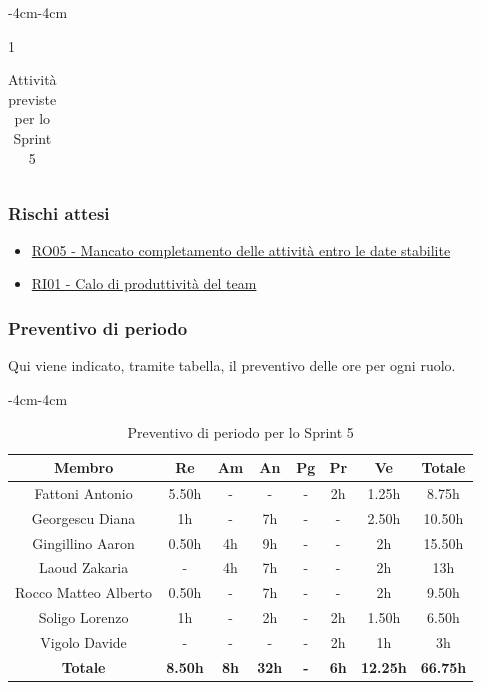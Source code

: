 \documentclass[a4paper,12pt]{article}
\begin{document}
\begin{table}[H]
\begin{adjustwidth}{-4cm}{-4cm}
\begin{spacing}{1}
\begin{tabular}{|p{4cm}|c|c|c|c|c|}
    \end{tabular}
    \end{spacing}
    \caption{Attività previste per lo Sprint 5}
    \end{adjustwidth}
\end{table}

\subsubsection{Rischi attesi}
\begin{itemize}
    \item \hyperref[RO05]{RO05 - Mancato completamento delle attività entro le date stabilite}
    \item \hyperref[RI01]{RI01 - Calo di produttività del team}
\end{itemize}

\subsubsection{Preventivo di periodo}
Qui viene indicato, tramite tabella, il preventivo delle ore per ogni ruolo.
\begin{table}[H]
    \begin{adjustwidth}{-4cm}{-4cm}
    \centering
    \begin{tabular}{|c|c|c|c|c|c|c|c|}
        \hline
        \textbf{Membro}& \textbf{Re} & \textbf{Am} & \textbf{An} & \textbf{Pg} & \textbf{Pr} & \textbf{Ve} & \textbf{Totale} \\
        \hline
        Fattoni Antonio & 5.50h & - & - & - & 2h & 1.25h & 8.75h \\
        \hline
        Georgescu Diana& 1h & - & 7h & - & - & 2.50h & 10.50h \\
        \hline
        Gingillino Aaron& 0.50h & 4h & 9h & - & - & 2h & 15.50h \\
        \hline
        Laoud Zakaria& - & 4h & 7h & - & - & 2h & 13h\\
        \hline
        Rocco Matteo Alberto & 0.50h & - & 7h & - & - & 2h & 9.50h \\
        \hline
        Soligo Lorenzo& 1h & - & 2h & - & 2h & 1.50h & 6.50h \\
        \hline
        Vigolo Davide & - & - & - & - & 2h & 1h & 3h \\
        \hline
        \textbf{Totale} & \textbf{8.50h} & \textbf{8h} & \textbf{32h} & \textbf{-} & \textbf{6h} & \textbf{12.25h} & \textbf{66.75h} \\
        \hline
    \end{tabular}
    \caption{Preventivo di periodo per lo Sprint 5}
    \end{adjustwidth}
\end{table}
\end{document}

